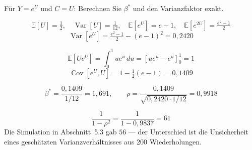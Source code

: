 \begin{aufgabe}
Für $Y = e^{U}$ und $C = U$: Berechnen Sie $\beta^*$ und den Varianzfaktor exakt.

\loesung
{}
\[ \mathbb E[U] = \tfrac12, \quad \operatorname{Var}[U] = \tfrac1{12}, \quad \mathbb E[e^U] = e-1, \quad \mathbb E[e^{2U}] = \tfrac{e^2-1}{2} \]
\[ \operatorname{Var}[e^U] = \tfrac{e^2-1}{2} - (e-1)^2 = 0{,}2420 \]

\[ \mathbb E[U e^U] = \int_0^1 u e^u\,du = [ue^u - e^u]_0^1 = 1 \]
\[ \operatorname{Cov}[e^U,U] = 1 - \tfrac12(e-1) = 0{,}1409 \]

\[ \beta^* = \frac{0{,}1409}{1/12} = 1{,}691, \qquad \rho = \frac{0{,}1409}{\sqrt{0{,}2420\cdot 1/12}} = 0{,}9918 \]

\[ \frac{1}{1-\rho^2} = \frac{1}{1-0{,}9837} = 61 \]
Die Simulation in Abschnitt~5.3 gab $56$ --- der Unterschied ist die Unsicherheit eines geschätzten Varianzverhältnisses aus $200$ Wiederholungen.

\begin{center}
\begin{minipage}{0.88\textwidth}
\end{minipage}
\end{center}
\end{aufgabe}

